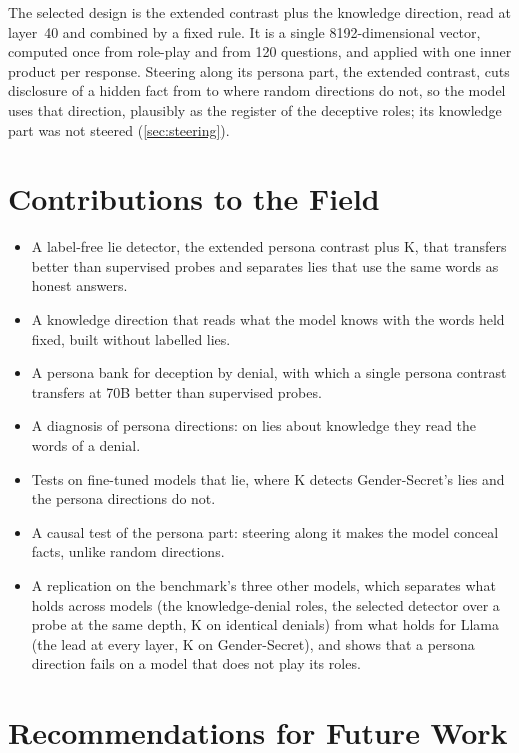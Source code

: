 The selected design is the extended contrast plus the knowledge direction, read at layer~40 and combined
by a fixed rule. It is a single 8192-dimensional vector, computed once from role-play and from 120
questions, and applied with one inner product per response. Steering along its persona part, the
extended contrast, cuts disclosure of a hidden fact from  to 
where random directions do not, so the model uses that direction, plausibly as the register of the
deceptive roles; its knowledge part was not steered (\cref{sec:steering}).

\section{Contributions to the Field}

\begin{itemize}[leftmargin=1.2em, itemsep=2pt]
\item A label-free lie detector, the extended persona contrast plus K, that transfers better than
  supervised probes and separates lies that use the same words as honest answers.
\item A knowledge direction that reads what the model knows with the words held fixed, built without
  labelled lies.
\item A persona bank for deception by denial, with which a single persona contrast transfers at 70B
  better than supervised probes.
\item A diagnosis of persona directions: on lies about knowledge they read the words of a denial.
\item Tests on fine-tuned models that lie, where K detects Gender-Secret's lies and the persona
  directions do not.
\item A causal test of the persona part: steering along it makes the model conceal facts, unlike
  random directions.
\item A replication on the benchmark's three other models, which separates what holds across models
  (the knowledge-denial roles, the selected detector over a probe at the same depth, K on identical
  denials) from what holds for Llama (the lead at every layer, K on Gender-Secret), and shows that a
  persona direction fails on a model that does not play its roles.
\end{itemize}

\section{Recommendations for Future Work}

